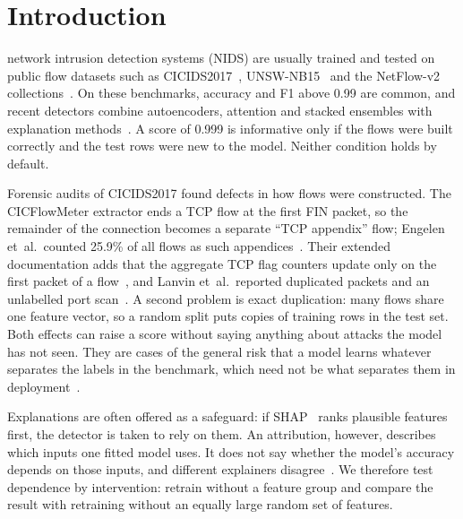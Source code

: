 \documentclass[journal]{IEEEtran}
\begin{document}
\section{Introduction}
 network intrusion detection systems (NIDS) are usually trained
and tested on public flow datasets such as CICIDS2017~\cite{sharafaldin2018},
UNSW-NB15~\cite{moustafa2015} and the NetFlow-v2 collections~\cite{sarhan2022}. On these
benchmarks, accuracy and F1 above 0.99 are common, and recent detectors combine autoencoders,
attention and stacked ensembles with explanation methods~\cite{nezhadsistani2026,fang2026,wardana2026}.
A score of 0.999 is informative only if the flows were built correctly and the test rows were
new to the model. Neither condition holds by default.

Forensic audits of CICIDS2017 found defects in how flows were constructed. The CICFlowMeter
extractor ends a TCP flow at the first FIN packet, so the remainder of the connection becomes a
separate ``TCP appendix'' flow; Engelen et~al.\ counted 25.9\% of all flows as such
appendices~\cite{engelen2021}. %
Their extended documentation adds that the aggregate TCP
flag counters update only on the first packet of a flow~\cite{engelen2021ext}, and Lanvin et~al.\ reported duplicated packets and an unlabelled port scan~\cite{lanvin2023}. A second problem
is exact duplication: many flows share one feature vector, so a random split puts copies of
training rows in the test set. Both effects can raise a score without saying anything about
attacks the model has not seen. They are cases of the general risk that a model learns
whatever separates the labels in the benchmark, which need not be what separates them in
deployment~\cite{geirhos2020,arp2022}.

Explanations are often offered as a safeguard: if SHAP~\cite{lundberg2017} ranks plausible
features first, the detector is taken to rely on them. An attribution, however, describes which
inputs one fitted model uses. It does not say whether the model's accuracy depends on those
inputs, and different explainers disagree~\cite{arreche2024}. We therefore test dependence by
intervention: retrain without a feature group and compare the result with retraining without an
equally large random set of features.
\end{document}
